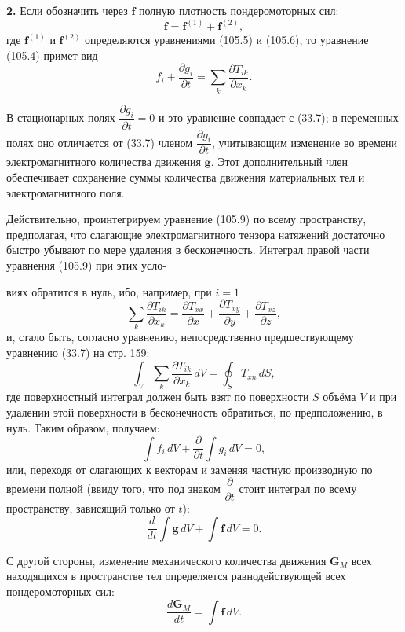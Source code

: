 \documentclass[a4paper,12pt]{article}
\begin{document}
\textbf{2.} Если обозначить через $\mathbf{f}$ полную плотность
пондеромоторных сил:
\begin{equation}
    \mathbf{f} = \mathbf{f}^{(1)} + \mathbf{f}^{(2)},
    \tag{105.8}
\end{equation}
где $\mathbf{f}^{(1)}$ и $\mathbf{f}^{(2)}$ определяются уравнениями
(105.5) и (105.6), то уравнение (105.4) примет вид
\begin{equation}
    f_i + \frac{\partial g_i}{\partial t}
    = \sum_k\frac{\partial T_{ik}}{\partial x_k}.
    \tag{105.9}
\end{equation}

В стационарных полях $\dfrac{\partial g_i}{\partial t} = 0$ и это
уравнение совпадает с (33.7); в переменных полях оно отличается от (33.7)
членом $\dfrac{\partial g_i}{\partial t}$, учитывающим изменение во
времени электромагнитного количества движения $\mathbf{g}$. Этот
дополнительный член обеспечивает сохранение суммы количества движения
материальных тел и электромагнитного поля.

Действительно, проинтегрируем уравнение (105.9) по всему пространству,
предполагая, что слагающие электромагнитного тензора натяжений достаточно
быстро убывают по мере удаления в бесконечность. Интеграл правой части
уравнения (105.9) при этих усло-


виях обратится в нуль, ибо, например, при $i = 1$
$$
    \sum_k\frac{\partial T_{ik}}{\partial x_k}
    = \frac{\partial T_{xx}}{\partial x}
    + \frac{\partial T_{xy}}{\partial y}
    + \frac{\partial T_{xz}}{\partial z},
$$
и, стало быть, согласно уравнению, непосредственно предшествующему
уравнению (33.7) на стр. 159:
$$
    \int_V\sum_k\frac{\partial T_{ik}}{\partial x_k}\,dV
    = \oint_S T_{xn}\,dS,
$$
где поверхностный интеграл должен быть взят по поверхности $S$ объёма
$V$ и при удалении этой поверхности в бесконечность обратиться, по
предположению, в нуль. Таким образом, получаем:
$$
    \int f_i\,dV + \frac{\partial}{\partial t}\int g_i\,dV = 0,
$$
или, переходя от слагающих к векторам и заменяя частную производную
по времени полной (ввиду того, что под знаком $\dfrac{\partial}{\partial t}$
стоит интеграл по всему пространству, зависящий только от $t$):
$$
    \frac{d}{dt}\int\mathbf{g}\,dV + \int\mathbf{f}\,dV = 0.
$$

С другой стороны, изменение механического количества движения
$\mathbf{G}_M$ всех находящихся в пространстве тел определяется
равнодействующей всех пондеромоторных сил:
$$
    \frac{d\mathbf{G}_M}{dt} = \int\mathbf{f}\,dV.
$$
\end{document}
